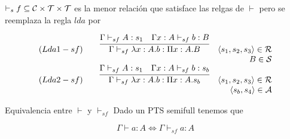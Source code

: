 \begin{definition}[$\vdash_sf$]

$\vdash_sf \subseteq \mathcal{C}\times\mathcal{T}\times\mathcal{T}$ es la menor relación que satisface las relgas de $\vdash$ pero
se reemplaza la regla $lda$ por

\[
\begin{array}{llcr}
	(Lda1-sf) & &\infer{\Gamma \vdash_{sf} \lambda x:A.b : \Pi x:A.B}{\Gamma \vdash_{sf} A:s_1& \Gamma x:A \vdash_{sf} b : B} & \langle s_1,s_2,s_3 \rangle \in \cR  \\  
	          & &                                                                                                             & B \in \cS  \\ 
	(Lda2-sf) & &\infer{\Gamma \vdash_{sf} \lambda x:A.b : \Pi x:A.s_b}{\Gamma \vdash_{sf} A:s_1& \Gamma x:A \vdash_{sf} b : s_b} & \langle s_1,s_2,s_3 \rangle \in \cR \\ 
	          & &                                                                                                             & \langle s_b, s_4 \rangle \in \cA  \\ 
	

	
\end{array}
\]


\end{definition}

\begin{lemma}{Equivalencia entre $\vdash$ y $\vdash_{sf}$}
Dado un PTS semifull tenemos que

\begin{equation}
\Gamma \vdash a : A \Leftrightarrow \Gamma \vdash_{sf} a: A
\end{equation}

\end{lemma}



